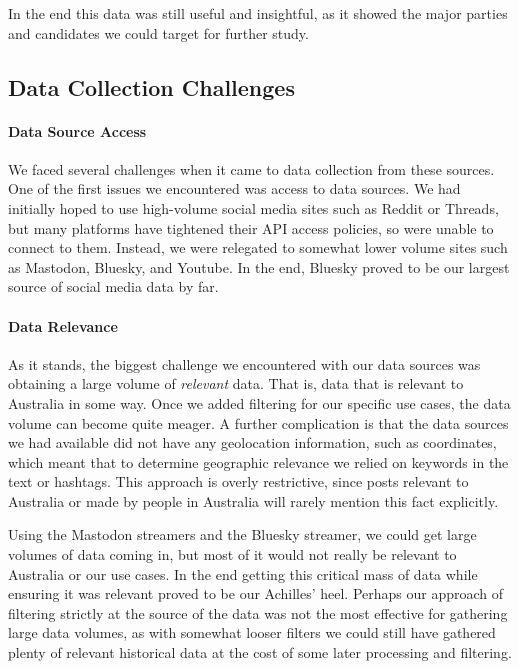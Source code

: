 In the end this data was still useful and insightful, as it showed the major parties and candidates we could target for further study.

\subsection{Data Collection Challenges}\label{DataGatherChallenges}

\paragraph{Data Source Access} We faced several challenges when it came to data collection from these sources. One of the first issues we encountered was access to data sources. We had initially hoped to use high-volume social media sites such as Reddit or Threads, but many platforms have tightened their API access policies, so were unable to connect to them. Instead, we were relegated to somewhat lower volume sites such as Mastodon, Bluesky, and Youtube. In the end, Bluesky proved to be our largest source of social media data by far.

\paragraph{Data Relevance} As it stands, the biggest challenge we encountered with our data sources was obtaining a large volume of \textit{relevant} data. That is, data that is relevant to Australia in some way. Once we added filtering for our specific use cases, the data volume can become quite meager. A further complication is that the data sources we had available did not have any geolocation information, such as coordinates, which meant that to determine geographic relevance we relied on keywords in the text or hashtags. This approach is overly restrictive, since posts relevant to Australia or made by people in Australia will rarely mention this fact explicitly.

Using the Mastodon streamers and the Bluesky streamer, we could get large volumes of data coming in, but most of it would not really be relevant to Australia or our use cases. In the end getting this critical mass of data while ensuring it was relevant proved to be our Achilles' heel. Perhaps our approach of filtering strictly at the source of the data was not the most effective for gathering large data volumes, as with somewhat looser filters we could still have gathered plenty of relevant historical data at the cost of some later processing and filtering.


